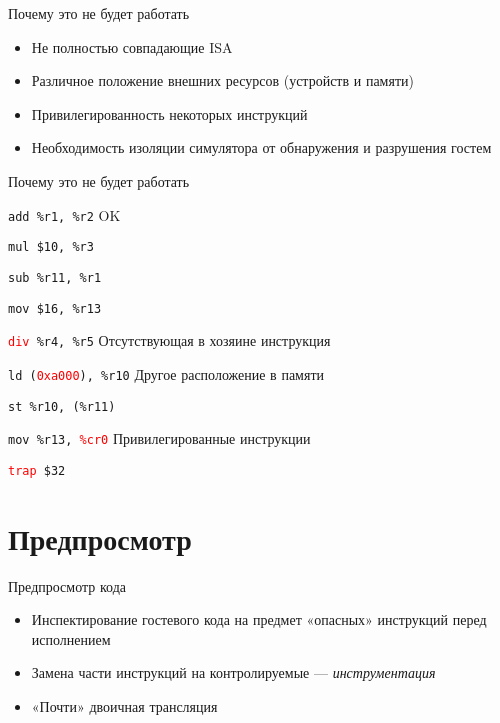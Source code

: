 \documentclass{beamer}
\begin{document}
\begin{frame}{Почему это не будет работать}
\begin{itemize}
\item Не полностью совпадающие ISA
\item Различное положение внешних ресурсов (устройств и памяти)
\item Привилегированность некоторых инструкций
\item Необходимость изоляции симулятора от обнаружения и разрушения гостем
\end{itemize}
\end{frame}

\begin{frame}{Почему это не будет работать}

\texttt{add \%r1, \%r2} \hfill OK

\texttt{mul \$10, \%r3}

\texttt{sub \%r11, \%r1}

\texttt{mov \$16, \%r13}

\medskip

\texttt{\textcolor{red}{div} \%r4, \%r5} \hfill Отсутствующая в хозяине инструкция

\medskip

\texttt{ld (\textcolor{red}{0xa000}), \%r10} \hfill Другое расположение в памяти

\texttt{st \%r10, (\%r11)}

\medskip

\texttt{mov \%r13, \textcolor{red}{\%cr0}} \hfill Привилегированные инструкции

\texttt{\textcolor{red}{trap} \$32}

\end{frame}

\section{Предпросмотр}

\begin{frame}{Предпросмотр кода}

\begin{itemize}
\item Инспектирование гостевого кода на предмет «опасных» инструкций перед исполнением
\item Замена части инструкций на контролируемые — \textit{инструментация}
\item «Почти» двоичная трансляция
\end{itemize}

\end{frame}
\end{document}

